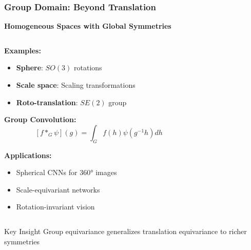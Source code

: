 \begin{frame}[fragile]\frametitle{Group Domain: Beyond Translation}

\begin{center}
\textbf{Homogeneous Spaces with Global Symmetries}
\end{center}

\begin{columns}
\begin{column}{0.5\textwidth}
\textbf{Examples:}
\begin{itemize}
\item \textbf{Sphere}: $SO(3)$ rotations
\item \textbf{Scale space}: Scaling transformations  
\item \textbf{Roto-translation}: $SE(2)$ group
\end{itemize}

\vspace{0.5cm}
\textbf{Group Convolution:}
$$[f *_G \psi](g) = \int_G f(h) \psi(g^{-1}h) dh$$

\textbf{Applications:}
\begin{itemize}
\item Spherical CNNs for 360° images
\item Scale-equivariant networks
\item Rotation-invariant vision
\end{itemize}
\end{column}
\begin{column}{0.5\textwidth}

\end{column}
\end{columns}

\begin{block}{Key Insight}
Group equivariance generalizes translation equivariance to richer symmetries
\end{block}

\end{frame}

